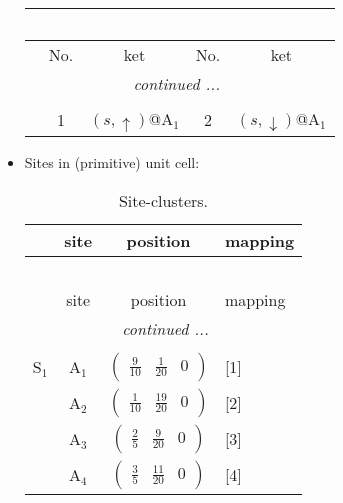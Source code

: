 \documentclass[fleqn,10pt,landscape]{article}
\begin{document}
\begin{itemize}
\begin{center}
\begin{longtable}{c|cc|cc}
\multicolumn{4}{l}{\tablename\ \thetable{}} \\
 \hline \hline
 & No. & ket & No. & ket \\ \hline \endhead

 \hline \hline
\multicolumn{4}{r}{\footnotesize\it continued ...} \\ \endfoot

 \hline \hline
\multicolumn{4}{r}{} \\ \endlastfoot

 & 1 & $(s,\uparrow)$@A$_{1}$ & 2 & $(s,\downarrow)$@A$_{1}$ \\
\end{longtable}
\end{center}

\item Sites in (primitive) unit cell:
\begin{center}
\renewcommand{\arraystretch}{1.3}
\begin{longtable}{cc|c|l}
\caption{Site-clusters.}
 \\
 \hline \hline
 & site & position & mapping \\ \hline \endfirsthead

\multicolumn{3}{l}{\tablename\ \thetable{}} \\
 \hline \hline
 & site & position & mapping \\ \hline \endhead

 \hline \hline
\multicolumn{3}{r}{\footnotesize\it continued ...} \\ \endfoot

 \hline \hline
\multicolumn{3}{r}{} \\ \endlastfoot

S$_{1}$ & A$_1$ & $\begin{pmatrix} \frac{9}{10} & \frac{1}{20} & 0 \end{pmatrix}$ & [1] \\
& A$_2$ & $\begin{pmatrix} \frac{1}{10} & \frac{19}{20} & 0 \end{pmatrix}$ & [2] \\
& A$_3$ & $\begin{pmatrix} \frac{2}{5} & \frac{9}{20} & 0 \end{pmatrix}$ & [3] \\
& A$_4$ & $\begin{pmatrix} \frac{3}{5} & \frac{11}{20} & 0 \end{pmatrix}$ & [4] \\
\end{longtable}
\end{center}


\end{itemize}
\end{document}

